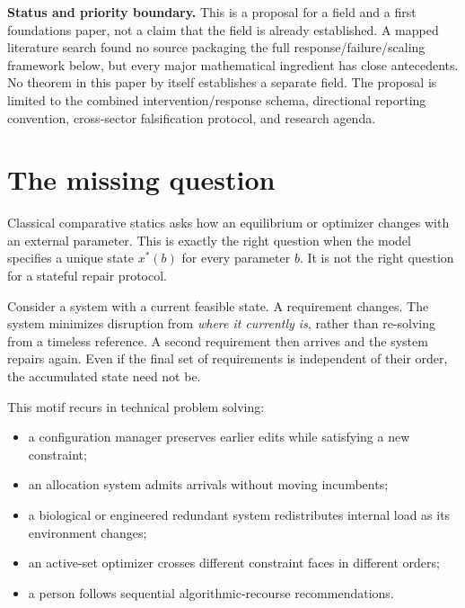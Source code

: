 \documentclass[11pt]{article}
\theoremstyle{definition}
\theoremstyle{remark}
\begin{document}
\vspace{0.8em}
\begin{center}
\begin{minipage}{0.92\textwidth}
\colorbox{NCSGray}{%
\parbox{0.96\textwidth}{\small
\textbf{Status and priority boundary.}
This is a proposal for a field and a first foundations paper, not a claim that
the field is already established. A mapped literature search found no source
packaging the full response/failure/scaling framework below, but every major
mathematical ingredient has close antecedents. No theorem in this paper by
itself establishes a separate field. The proposal is limited to the combined
intervention/response schema, directional reporting convention,
cross-sector falsification protocol, and research agenda.}}
\end{minipage}
\end{center}

\section{The missing question}

Classical comparative statics asks how an equilibrium or optimizer changes
with an external parameter. This is exactly the right question when the model
specifies a unique state \(x^\ast(b)\) for every parameter \(b\). It is not the
right question for a stateful repair protocol.

Consider a system with a current feasible state. A requirement changes. The
system minimizes disruption from \emph{where it currently is}, rather than
re-solving from a timeless reference. A second requirement then arrives and
the system repairs again. Even if the final set of requirements is independent
of their order, the accumulated state need not be.

This motif recurs in technical problem solving:

\begin{itemize}
  \item a configuration manager preserves earlier edits while satisfying a
  new constraint;
  \item an allocation system admits arrivals without moving incumbents;
  \item a biological or engineered redundant system redistributes internal
  load as its environment changes;
  \item an active-set optimizer crosses different constraint faces in
  different orders;
  \item a person follows sequential algorithmic-recourse recommendations.
\end{itemize}
\end{document}
